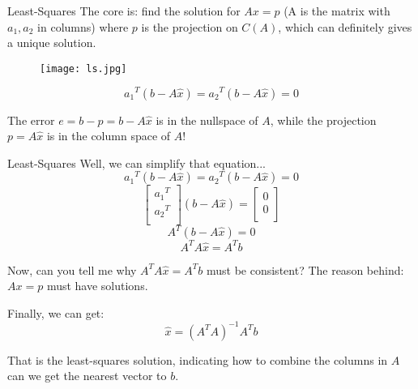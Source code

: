 \documentclass{beamer}
\begin{document}
\begin{frame}{Least-Squares}
The core is: find the solution for $Ax=p$ (A is the matrix with $a_1,a_2$ in columns) where $p$ is the projection on $C(A)$, which can definitely gives a unique solution.

\begin{figure}
    \centering
    \texttt{[image: ls.jpg]}
\end{figure}
\begin{equation*}
    {a_1}^T\left( b-A\hat{x} \right) ={a_2}^T\left( b-A\hat{x} \right) =0
\end{equation*}

The error $e=b-p=b-A\hat{x}$ is in the nullspace of $A$, while the projection $p=A\hat{x}$ is in the column space of $A$!
\end{frame}

\begin{frame}{Least-Squares}
Well, we can simplify that equation...
    \begin{equation*}
        {a_1}^T\left( b-A\hat{x} \right) ={a_2}^T\left( b-A\hat{x} \right) =0
    \end{equation*}
\begin{equation*}
    \left[ \begin{array}{c}
        {a_1}^T\\
        {a_2}^T\\
    \end{array} \right] \left( b-A\hat{x} \right) =\left[ \begin{array}{c}
        0\\
        0\\
    \end{array} \right]
\end{equation*}
\begin{equation*}
    A^T\left( b-A\hat{x} \right) =0
\end{equation*}
\begin{equation*}
    A^TA\hat{x} =A^Tb
\end{equation*}

Now, can you tell me why $A^TA\hat{x} =A^Tb$ must be consistent? The reason behind: $Ax=p$ must have solutions.

\vspace{3pt}
Finally, we can get:
\begin{equation*}
    \hat{x} =(A^TA)^{-1}A^Tb
\end{equation*}

That is the least-squares solution, indicating how to combine the columns in $A$ can we get the nearest vector to $b$.
\end{frame}
\end{document}

